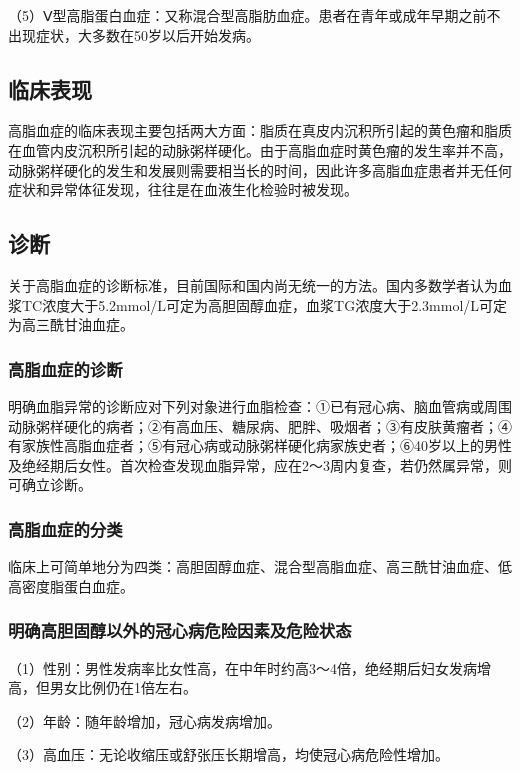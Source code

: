 （5）Ⅴ型高脂蛋白血症：又称混合型高脂肪血症。患者在青年或成年早期之前不出现症状，大多数在50岁以后开始发病。

\subsection{临床表现}

高脂血症的临床表现主要包括两大方面：脂质在真皮内沉积所引起的黄色瘤和脂质在血管内皮沉积所引起的动脉粥样硬化。由于高脂血症时黄色瘤的发生率并不高，动脉粥样硬化的发生和发展则需要相当长的时间，因此许多高脂血症患者并无任何症状和异常体征发现，往往是在血液生化检验时被发现。

\subsection{诊断}

关于高脂血症的诊断标准，目前国际和国内尚无统一的方法。国内多数学者认为血浆TC浓度大于5.2mmol/L可定为高胆固醇血症，血浆TG浓度大于2.3mmol/L可定为高三酰甘油血症。

\subsubsection{高脂血症的诊断}

明确血脂异常的诊断应对下列对象进行血脂检查：①已有冠心病、脑血管病或周围动脉粥样硬化的病者；②有高血压、糖尿病、肥胖、吸烟者；③有皮肤黄瘤者；④有家族性高脂血症者；⑤有冠心病或动脉粥样硬化病家族史者；⑥40岁以上的男性及绝经期后女性。首次检查发现血脂异常，应在2～3周内复查，若仍然属异常，则可确立诊断。

\subsubsection{高脂血症的分类}

临床上可简单地分为四类：高胆固醇血症、混合型高脂血症、高三酰甘油血症、低高密度脂蛋白血症。

\subsubsection{明确高胆固醇以外的冠心病危险因素及危险状态}

（1）性别：男性发病率比女性高，在中年时约高3～4倍，绝经期后妇女发病增高，但男女比例仍在1倍左右。

（2）年龄：随年龄增加，冠心病发病增加。

（3）高血压：无论收缩压或舒张压长期增高，均使冠心病危险性增加。

